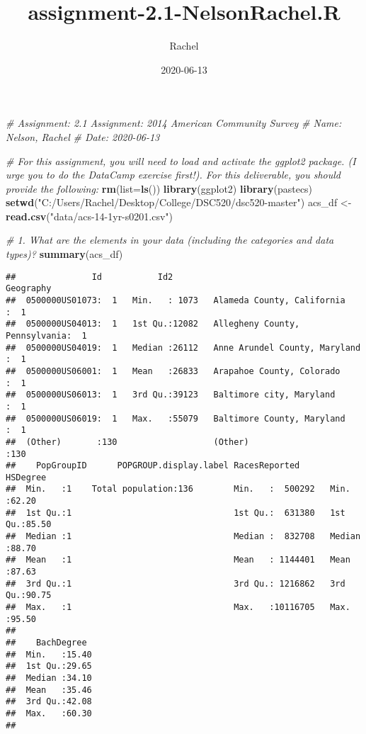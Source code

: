 \documentclass[
]{article}
\title{assignment-2.1-NelsonRachel.R}
\author{Rachel}
\date{2020-06-13}
\newenvironment{Shaded}{\begin{snugshade}}{\end{snugshade}}
\newcommand{\CommentTok}[1]{\textcolor[rgb]{0.56,0.35,0.01}{\textit{#1}}}
\newcommand{\DataTypeTok}[1]{\textcolor[rgb]{0.13,0.29,0.53}{#1}}
\newcommand{\KeywordTok}[1]{\textcolor[rgb]{0.13,0.29,0.53}{\textbf{#1}}}
\newcommand{\NormalTok}[1]{#1}
\newcommand{\StringTok}[1]{\textcolor[rgb]{0.31,0.60,0.02}{#1}}
\begin{document}
\maketitle

\begin{Shaded}
\begin{Highlighting}[]
\CommentTok{# Assignment: 2.1 Assignment: 2014 American Community Survey}
\CommentTok{# Name: Nelson, Rachel}
\CommentTok{# Date: 2020-06-13}


\CommentTok{# For this assignment, you will need to load and activate the ggplot2 package. (I urge you to do the DataCamp exercise first!). For this deliverable, you should provide the following:}
\KeywordTok{rm}\NormalTok{(}\DataTypeTok{list=}\KeywordTok{ls}\NormalTok{())}
\KeywordTok{library}\NormalTok{(ggplot2)}
\KeywordTok{library}\NormalTok{(pastecs)}
\KeywordTok{setwd}\NormalTok{(}\StringTok{"C:/Users/Rachel/Desktop/College/DSC520/dsc520-master"}\NormalTok{)}
\NormalTok{acs_df <-}\StringTok{ }\KeywordTok{read.csv}\NormalTok{(}\StringTok{"data/acs-14-1yr-s0201.csv"}\NormalTok{)}

\CommentTok{# 1. What are the elements in your data (including the categories and data types)?}
\KeywordTok{summary}\NormalTok{(acs_df)}
\end{Highlighting}
\end{Shaded}

\begin{verbatim}
##               Id           Id2                                 Geography  
##  0500000US01073:  1   Min.   : 1073   Alameda County, California    :  1  
##  0500000US04013:  1   1st Qu.:12082   Allegheny County, Pennsylvania:  1  
##  0500000US04019:  1   Median :26112   Anne Arundel County, Maryland :  1  
##  0500000US06001:  1   Mean   :26833   Arapahoe County, Colorado     :  1  
##  0500000US06013:  1   3rd Qu.:39123   Baltimore city, Maryland      :  1  
##  0500000US06019:  1   Max.   :55079   Baltimore County, Maryland    :  1  
##  (Other)       :130                   (Other)                       :130  
##    PopGroupID      POPGROUP.display.label RacesReported         HSDegree    
##  Min.   :1    Total population:136        Min.   :  500292   Min.   :62.20  
##  1st Qu.:1                                1st Qu.:  631380   1st Qu.:85.50  
##  Median :1                                Median :  832708   Median :88.70  
##  Mean   :1                                Mean   : 1144401   Mean   :87.63  
##  3rd Qu.:1                                3rd Qu.: 1216862   3rd Qu.:90.75  
##  Max.   :1                                Max.   :10116705   Max.   :95.50  
##                                                                             
##    BachDegree   
##  Min.   :15.40  
##  1st Qu.:29.65  
##  Median :34.10  
##  Mean   :35.46  
##  3rd Qu.:42.08  
##  Max.   :60.30  
## 
\end{verbatim}
\end{document}
